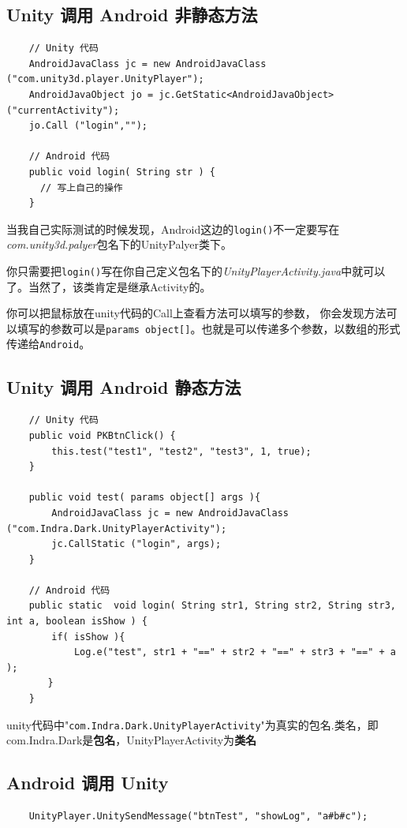 \documentclass[UTF8,a4paper,12pt]{ctexbook}
\begin{document}
		\subsection{Unity 调用 Android 非静态方法}
			\begin{lstlisting}
	// Unity 代码
	AndroidJavaClass jc = new AndroidJavaClass ("com.unity3d.player.UnityPlayer");
	AndroidJavaObject jo = jc.GetStatic<AndroidJavaObject> ("currentActivity");
	jo.Call ("login","");	
	
	// Android 代码
	public void login( String str ) {      
      // 写上自己的操作
	}
			\end{lstlisting}
		
			当我自己实际测试的时候发现，Android这边的\verb|login()|不一定要写在\textit{com.unity3d.palyer}包名下的UnityPalyer类下。
			
			你只需要把\verb|login()|写在你自己定义包名下的\textit{UnityPlayerActivity.java}中就可以了。当然了，该类肯定是继承Activity的。
			
			你可以把鼠标放在unity代码的Call上查看方法可以填写的参数， 你会发现方法可以填写的参数可以是\verb|params object[]|。也就是可以传递多个参数，以数组的形式传递给\verb|Android|。
		
		\subsection{Unity 调用 Android 静态方法}
			\begin{lstlisting}
	// Unity 代码
	public void PKBtnClick() {
	    this.test("test1", "test2", "test3", 1, true);
	}
	
	public void test( params object[] args ){
	    AndroidJavaClass jc = new AndroidJavaClass ("com.Indra.Dark.UnityPlayerActivity");
	    jc.CallStatic ("login", args);
	}
	
	// Android 代码
	public static  void login( String str1, String str2, String str3, int a, boolean isShow ) {
	    if( isShow ){            
	        Log.e("test", str1 + "==" + str2 + "==" + str3 + "==" + a );
	　　}
	}
			\end{lstlisting}
			
			unity代码中"\verb|com.Indra.Dark.UnityPlayerActivity|"为真实的包名.类名，即com.Indra.Dark是\textbf{包名}，UnityPlayerActivity为\textbf{类名}
				
		\subsection{Android 调用 Unity}
			\begin{lstlisting}
	UnityPlayer.UnitySendMessage("btnTest", "showLog", "a#b#c");
			\end{lstlisting}
			
\end{document}
